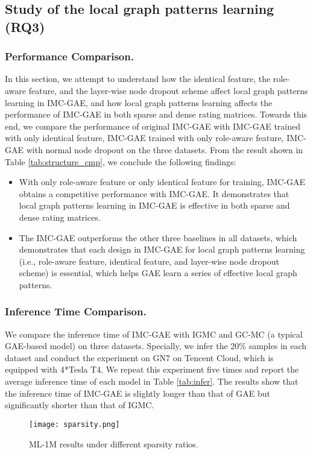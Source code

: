 \documentclass[sigconf]{acmart}
\begin{document}
\subsection{Study of the local graph patterns learning (RQ3)}
\subsubsection{Performance Comparison.} In this section, we attempt to understand how the identical feature, the role-aware feature, and the layer-wise node dropout scheme affect local graph patterns learning in IMC-GAE, and how local graph patterns learning affects the performance of IMC-GAE in both sparse and dense rating matrices. Towards this end, we compare the performance of original IMC-GAE with IMC-GAE trained with only identical feature, IMC-GAE trained with only role-aware feature, IMC-GAE with normal node dropout on the three datasets.
From the result shown in Table \ref{tab:structure_cmp}, we conclude the following findings:
\begin{itemize}[leftmargin=*]
    \item  With only role-aware feature or only identical feature for training, IMC-GAE obtains a competitive performance with IMC-GAE. It demonstrates that local graph patterns learning in IMC-GAE is effective in both sparse and dense rating matrices.
    \item The IMC-GAE outperforms the other three baselines in all datasets, which demonstrates that each design in IMC-GAE for local graph patterns learning (i.e., role-aware feature, identical feature, and layer-wise node dropout scheme) is essential, which helps GAE learn a series of effective local graph patterns. 
\end{itemize}
\subsubsection{Inference Time Comparison.} We compare the inference time of IMC-GAE with IGMC and GC-MC (a typical GAE-based model) on three datasets. Specially, we infer the 20\% samples in each dataset and conduct the experiment on GN7 on Tencent Cloud, which is equipped with 4*Tesla T4. We repeat this experiment five times and report the average inference time of each model in Table \ref{tab:infer}. The results show that the inference time of IMC-GAE is slightly longer than that of GAE but significantly shorter than that of IGMC.

\begin{figure}[tp]
    \centering\texttt{[image: sparsity.png]}
    \caption{ML-1M results under different sparsity ratios.}
    \label{fig:sparse}
\end{figure}
\end{document}
